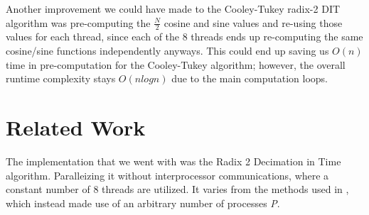 \documentclass[journal]{IEEEtran}
\begin{document}
	\par{
		Another improvement we could have made to the Cooley-Tukey radix-2 DIT
		algorithm was pre-computing the $\frac{N}{2}$ cosine and sine values and
		re-using those values for each thread, since each of the 8 threads ends 
		up re-computing the same cosine/sine functions independently anyways.
		This could end up saving us $O(n)$ time in pre-computation for the 
		Cooley-Tukey algorithm; however, the overall runtime complexity 
		stays $O(nlogn)$ due to the main computation loops.
	}

\section{Related Work}
	\par{
		The implementation that we went with was the Radix 2 Decimation in Time algorithm. Paralleizing it without 
		interprocessor communications, where a constant number of 8 threads are utilized. It varies from the 
		methods used in \cite{Xie}, which instead made use of an arbitrary number of processes \textit{P}. 
	}
\end{document}
